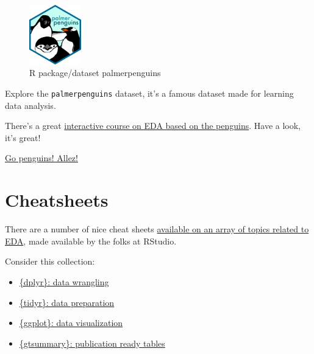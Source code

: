 \documentclass[
  letterpaper,
  DIV=11,
  numbers=noendperiod]{scrreprt}
\theoremstyle{definition}
\theoremstyle{definition}
\theoremstyle{remark}
\begin{document}
\begin{figure}

{\centering \includegraphics[width=0.2\textwidth,height=\textheight]{./img/palmerpenguins-logo.png}

}

\caption{R package/dataset palmerpenguins}

\end{figure}

Explore the \texttt{palmerpenguins} dataset, it's a famous dataset made
for learning data analysis.

There's a great
\href{https://allisonhorst.shinyapps.io/dplyr-learnr/\#section-welcome}{interactive
course on EDA based on the penguins}. Have a look, it's great!

\href{https://media.giphy.com/media/3og0IO5z8Rd30ktV6g/giphy.gif}{Go
penguins! Allez!}

\hypertarget{cheatsheets}{%
\section{Cheatsheets}\label{cheatsheets}}

There are a number of nice cheat sheets
\href{https://www.rstudio.com/resources/cheatsheets/}{available on an
array of topics related to EDA}, made available by the folks at RStudio.

Consider this collection:

\begin{itemize}
\item
  \href{https://raw.githubusercontent.com/rstudio/cheatsheets/main/pngs/data-transformation.png}{\{dplyr\}:
  data wrangling}
\item
  \href{https://raw.githubusercontent.com/rstudio/cheatsheets/main/pngs/tidyr.png}{\{tidyr\}:
  data preparation}
\item
  \href{https://raw.githubusercontent.com/rstudio/cheatsheets/main/pngs/data-visualization.png}{\{ggplot\}:
  data visualization}
\item
  \href{https://raw.githubusercontent.com/rstudio/cheatsheets/main/pngs/gtsummary.png}{\{gtsummary\}:
  publication ready tables}
\end{itemize}
\end{document}

